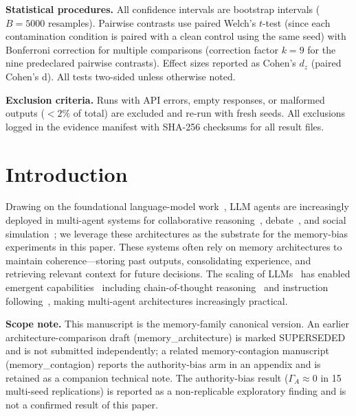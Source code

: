 \documentclass[11pt]{article}
\begin{document}
\textbf{Statistical procedures.} All confidence intervals are bootstrap intervals ($B=5000$ resamples). Pairwise contrasts use paired Welch's $t$-test (since each contamination condition is paired with a clean control using the same seed) with Bonferroni correction for multiple comparisons (correction factor $k=9$ for the nine predeclared pairwise contrasts). Effect sizes reported as Cohen's $d_z$ (paired Cohen's d). All tests two-sided unless otherwise noted.

\textbf{Exclusion criteria.} Runs with API errors, empty responses, or malformed outputs ($<2\%$ of total) are excluded and re-run with fresh seeds. All exclusions logged in the evidence manifest with SHA-256 checksums for all result files.

\section{Introduction}
\label{sec:intro}

Drawing on the foundational language-model work~\cite{brown2020language,touvron2023llama,zhao2023survey}, LLM agents are increasingly deployed in multi-agent systems for collaborative reasoning~\cite{du2024improving}, debate~\cite{li2023camel,liang2023multiagent}, and social simulation~\cite{park2023generative}; we leverage these architectures as the substrate for the memory-bias experiments in this paper. These systems often rely on memory architectures to maintain coherence---storing past outputs, consolidating experience, and retrieving relevant context for future decisions. The scaling of LLMs~\cite{kaplan2020scaling} has enabled emergent capabilities~\cite{wei2022emergent} including chain-of-thought reasoning~\cite{wei2022chain} and instruction following~\cite{ouyang2022training}, making multi-agent architectures increasingly practical.

\textbf{Scope note.} This manuscript is the memory-family canonical version. An earlier architecture-comparison draft (memory\_architecture) is marked SUPERSEDED and is not submitted independently; a related memory-contagion manuscript (memory\_contagion) reports the authority-bias arm in an appendix and is retained as a companion technical note. The authority-bias result ($\Gamma_A \approx 0$ in 15 multi-seed replications) is reported as a non-replicable exploratory finding and is not a confirmed result of this paper.
\end{document}
